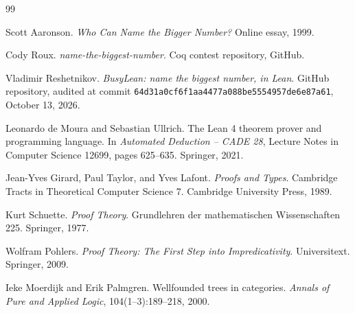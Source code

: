 \documentclass[11pt]{article}
\theoremstyle{definition}
\newcommand{\code}[1]{\texttt{#1}}
\begin{document}
\begin{thebibliography}{99}

Scott Aaronson.
\newblock \emph{Who Can Name the Bigger Number?}
\newblock Online essay, 1999.

Cody Roux.
\newblock \emph{name-the-biggest-number}.
\newblock Coq contest repository, GitHub.

Vladimir Reshetnikov.
\newblock \emph{BusyLean: name the biggest number, in Lean}.
\newblock GitHub repository, audited at commit
\code{64d31a0cf6f1aa4477a088be5554957de6e87a61}, October 13, 2026.

Leonardo de Moura and Sebastian Ullrich.
\newblock The Lean 4 theorem prover and programming language.
\newblock In \emph{Automated Deduction -- CADE 28}, Lecture Notes in Computer
Science 12699, pages 625--635. Springer, 2021.

Jean-Yves Girard, Paul Taylor, and Yves Lafont.
\newblock \emph{Proofs and Types}.
\newblock Cambridge Tracts in Theoretical Computer Science 7. Cambridge
University Press, 1989.

Kurt Schuette.
\newblock \emph{Proof Theory}.
\newblock Grundlehren der mathematischen Wissenschaften 225. Springer, 1977.

Wolfram Pohlers.
\newblock \emph{Proof Theory: The First Step into Impredicativity}.
\newblock Universitext. Springer, 2009.

Ieke Moerdijk and Erik Palmgren.
\newblock Wellfounded trees in categories.
\newblock \emph{Annals of Pure and Applied Logic}, 104(1--3):189--218, 2000.

\end{thebibliography}
\end{document}
